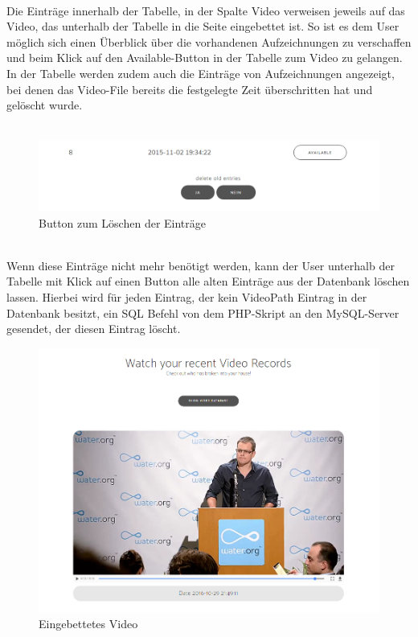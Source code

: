 \\
Die Eintr\"age innerhalb der Tabelle, in der Spalte Video verweisen jeweils auf das Video, das unterhalb der Tabelle in die Seite eingebettet ist. So ist es dem User m\"oglich sich einen \"Uberblick \"uber die vorhandenen Aufzeichnungen zu verschaffen und beim Klick auf den Available-Button in der Tabelle zum Video zu gelangen.
In der Tabelle werden zudem auch die Eintr\"age von Aufzeichnungen angezeigt, bei denen das Video-File bereits die festgelegte Zeit \"uberschritten hat und gel\"oscht wurde. \\
\\
\begin{figure}[htb]
  \centering
    \includegraphics[width=1.0\textwidth]{images/phpdel}
    \caption{Button zum L\"oschen der Eintr\"age}
\end{figure}
\\
Wenn diese Eintr\"age nicht mehr ben\"otigt werden, kann der User unterhalb der Tabelle mit Klick auf einen Button alle alten Eintr\"age aus der Datenbank l\"oschen lassen. Hierbei wird f\"ur jeden Eintrag, der kein VideoPath Eintrag in der Datenbank besitzt, ein SQL Befehl von dem PHP-Skript an den MySQL-Server gesendet, der diesen Eintrag l\"oscht.\\
\begin{figure}[htb]
  \centering
    \includegraphics[width=1.0\textwidth]{images/video}
    \caption{Eingebettetes Video}
\end{figure}
